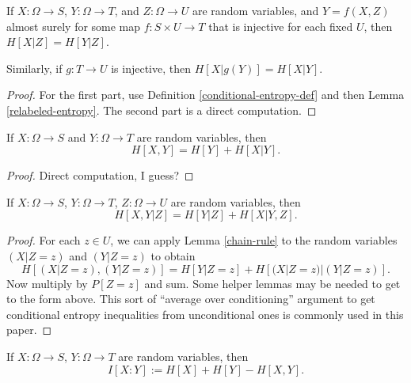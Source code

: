 \begin{lemma}\label{relabeled-entropy-cond}
  If $X: \Omega \to S$, $Y: \Omega \to T$, and $Z: \Omega \to U$ are random variables, and $Y = f(X,Z)$ almost surely for some map $f: S \times U \to T$ that is injective for each fixed $U$, then $H[X|Z] = H[Y|Z]$.

  Similarly, if $g: T \to U$ is injective, then $H[X|g(Y)] = H[X|Y]$.
\end{lemma}

\begin{proof}
  For the first part, use Definition \ref{conditional-entropy-def} and then Lemma \ref{relabeled-entropy}.  The second part is a direct computation.
\end{proof}


\begin{lemma}\label{chain-rule}
  \leanok
  If $X: \Omega \to S$ and $Y: \Omega \to T$ are random variables, then
  $$ H[X, Y] = H[Y] + H[X|Y].$$
  \end{lemma}
  \begin{proof}
  \leanok
  Direct computation, I guess?
\end{proof}

\begin{lemma}\label{conditional-chain-rule}
  If $X: \Omega \to S$, $Y: \Omega \to T$, $Z: \Omega \to U$ are random variables, then
$$ H[X, Y | Z ] = H[Y | Z] + H[X|Y, Z].$$
\end{lemma}

\begin{proof}   For each $z \in U$, we can apply Lemma \ref{chain-rule} to the random variables $(X|Z=z)$ and $(Y|Z=z)$ to obtain
  $$ H[ (X|Z=z),(Y|Z=z) ] = H[Y|Z=z] + H[(X|Z=z)|(Y|Z=z)].$$
  Now multiply by $P[Z=z]$ and sum.  Some helper lemmas may be needed to get to the form above.  This sort of ``average over conditioning'' argument to get conditional entropy inequalities from unconditional ones is commonly used in this paper.
\end{proof}

\begin{definition}
  \label{information-def}
  \leanok
  If $X: \Omega \to S$, $Y: \Omega \to T$ are random variables, then
  $$I[X : Y] := H[X] + H[Y] - H[X,Y].$$
\end{definition}

